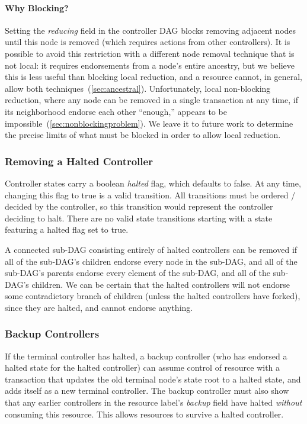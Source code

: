\documentclass[a4paper,USenglish,cleveref, autoref, thm-restate, anonymous]{lipics-v2021}
\begin{document}
\paragraph{Why Blocking?}
Setting the \textit{reducing} field in the controller DAG blocks removing adjacent nodes until this node is removed (which requires actions from other controllers).
It is possible to avoid this restriction with a different node removal technique that is not local: it requires endorsements from a node's entire ancestry, but we believe this is less useful than blocking local reduction, and a resource cannot, in general, allow both techniques~(\cref{sec:ancestral}).
Unfortunately, local non-blocking reduction, where any node can be removed in a single transaction at any time, if its neighborhood endorse each other ``enough,'' appears to be impossible~(\cref{sec:nonblockingproblem}).
We leave it to future work to determine the precise limits of what must be blocked in order to allow local reduction.



\subsubsection{Removing a Halted Controller}
Controller states carry a boolean \textit{halted} flag, which defaults to false. 
At any time, changing this flag to true is a valid transition.
All transitions must be ordered / decided by the controller, so this transition would represent the controller deciding to halt. 
There are no valid state transitions starting with a state featuring a halted flag set to true. 

A connected sub-DAG consisting entirely of halted controllers can be removed if all of the sub-DAG's children endorse every node in the sub-DAG, and all of the sub-DAG's parents endorse every element of the sub-DAG, and all of the sub-DAG's children. 
We can be certain that the halted controllers will not endorse some contradictory branch of children (unless the halted controllers have forked), since they are halted, and cannot endorse anything. 

\subsubsection{Backup Controllers}
If the terminal controller has halted, a backup controller (who has endorsed a halted state for the halted controller) can assume control of  resource with a transaction that updates the old terminal node's state root to a halted state, and adds itself as a new terminal controller. 
The backup controller must also show that any earlier controllers in the resource label's \textit{backup} field have halted \textit{without} consuming this resource. 
This allows resources to survive a halted controller. 
\end{document}
